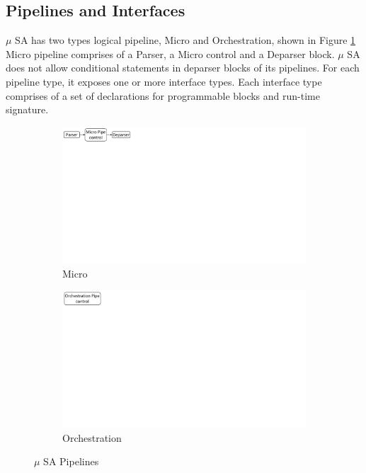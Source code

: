\subsection{Pipelines and Interfaces}
\label{subsection:pipelines}
$\mu$ SA has two types logical pipeline, Micro and Orchestration, shown in Figure \ref{fig:msa-pipelines}
Micro pipeline comprises of a Parser, a Micro control and a Deparser block.
$\mu$ SA does not allow conditional statements in deparser blocks of its pipelines.
For each pipeline type, it exposes one or more interface types.
Each interface type comprises of a set of declarations for programmable blocks and run-time signature.
\begin{figure}[ht]
    \centering
    \begin{subfigure}{0.59\linewidth}
        \centering
        \includegraphics[trim=0 482 692 0, clip,scale=0.45]{msa-pipeline}
        \caption{Micro}
    \end{subfigure}\vline
    \begin{subfigure}{0.41\linewidth}
        \centering
        \includegraphics[trim=0 480 805 0,clip,scale=0.45]{micro-orchestration-pipeline}
        \caption{Orchestration}
    \end{subfigure}
\caption{$\mu$ SA Pipelines}
\label{fig:msa-pipelines}
\end{figure}
